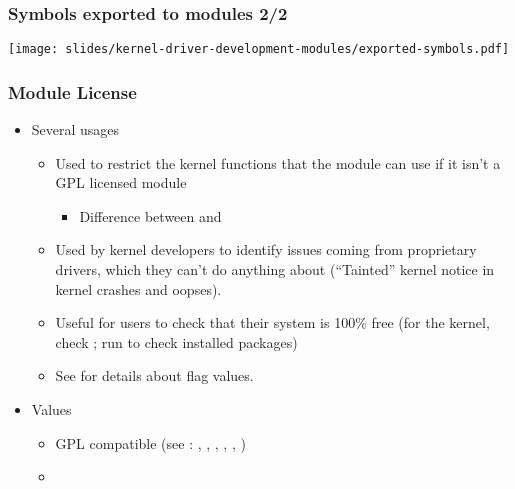\begin{frame}
  \frametitle{Symbols exported to modules 2/2}
  \begin{center}
    \texttt{[image: slides/kernel-driver-development-modules/exported-symbols.pdf]}
  \end{center}
\end{frame}

\begin{frame}
  \frametitle{Module License}
  \begin{itemize}
  \item Several usages
    \begin{itemize}
    \item Used to restrict the kernel functions that the module can
      use if it isn't a GPL licensed module
      \begin{itemize}
      \item Difference between  and
      \end{itemize}
    \item Used by kernel developers to identify issues coming from
      proprietary drivers, which they can't do anything about
      (“Tainted” kernel notice in kernel crashes and oopses).
    \item Useful for users to check that their system is 100\% free
      (for the kernel, check ; run
       to check installed packages)
    \item See 
      for details about  flag values.
    \end{itemize}
  \item Values
    \begin{itemize}
    \item GPL compatible (see :
      , , ,
      , , )
    \item {}
    \end{itemize}
  \end{itemize}
\end{frame}

